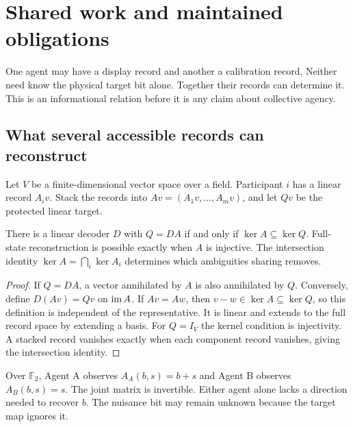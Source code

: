 \chapter{Shared work and maintained obligations}\label{Core:book:chapter-8}
\setcounter{section}{0}\label{Core:ch:shared}
One agent may have a display record and another a calibration record. Neither need know the physical target bit alone. Together their records can determine it. This is an informational relation before it is any claim about collective agency.

\section{What several accessible records can reconstruct}
Let $V$ be a finite-dimensional vector space over a field. Participant $i$ has a linear record $A_i v$. Stack the records into $Av=(A_1v,\ldots,A_mv)$, and let $Qv$ be the protected linear target.

\begin{Coreproposition}\label{Core:r:reconstruction}
There is a linear decoder $D$ with $Q=DA$ if and only if $\ker A\subseteq\ker Q$. Full-state reconstruction is possible exactly when $A$ is injective. The intersection identity $\ker A=\bigcap_i\ker A_i$ determines which ambiguities sharing removes.
\end{Coreproposition}
\begin{proof}
If $Q=DA$, a vector annihilated by $A$ is also annihilated by $Q$. Conversely, define $D(Av)=Qv$ on $\operatorname{im} A$. If $Av=Aw$, then $v-w\in\ker A\subseteq\ker Q$, so this definition is independent of the representative. It is linear and extends to the full record space by extending a basis. For $Q=I_V$ the kernel condition is injectivity. A stacked record vanishes exactly when each component record vanishes, giving the intersection identity.
\end{proof}

Over $\mathbb F_2$, Agent A observes $A_A(b,s)=b+s$ and Agent B observes $A_B(b,s)=s$. The joint matrix is invertible. Either agent alone lacks a direction needed to recover $b$. The nuisance bit may remain unknown because the target map ignores it.

